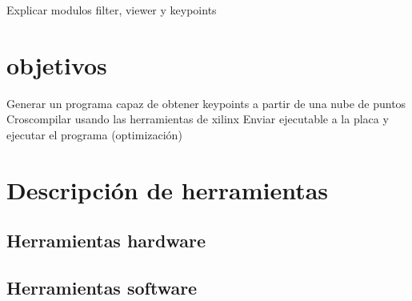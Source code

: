 Explicar modulos filter, viewer y keypoints

\section{objetivos}
Generar un programa capaz de obtener keypoints a partir de una nube de puntos
Croscompilar usando las herramientas de xilinx 
Enviar ejecutable a la placa y ejecutar el programa
(optimización)



\section{Descripción de herramientas}
\subsection{Herramientas hardware}
\subsection{Herramientas software}




